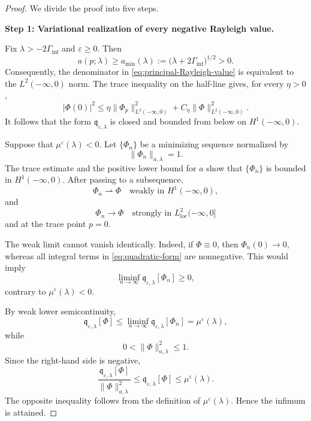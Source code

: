 \documentclass[11pt,reqno]{amsart}
\numberwithin{equation}{section}
\theoremstyle{definition}
\theoremstyle{remark}
\begin{document}
\begin{proof}
We divide the proof into five steps.

\medskip
\noindent
\textbf{Step 1: Variational realization of every negative Rayleigh value.}

Fix $\lambda>-2\Gamma_{\inf}$ and $\varepsilon\geq0$.  Then
\[
a(p;\lambda)\geq
a_{\min}(\lambda)
:=
\bigl(\lambda+2\Gamma_{\inf}\bigr)^{1/2}>0.
\]
Consequently, the denominator in
\eqref{eq:principal-Rayleigh-value} is equivalent to the
$L^2(-\infty,0)$ norm.  The trace inequality on the half-line gives,
for every $\eta>0$,
\[
|\Phi(0)|^2
\leq
\eta\|\Phi_p\|_{L^2(-\infty,0)}^2
+
C_\eta\|\Phi\|_{L^2(-\infty,0)}^2.
\]
It follows that the form
$\mathfrak q_{\varepsilon,\lambda}$ is closed and bounded from below on
$H^1(-\infty,0)$.

Suppose that $\mu^\varepsilon(\lambda)<0$.  Let $\{\Phi_n\}$ be a minimizing
sequence normalized by
\[
\|\Phi_n\|_{a,\lambda}=1.
\]
The trace estimate and the positive lower bound for $a$ show that
$\{\Phi_n\}$ is bounded in $H^1(-\infty,0)$.  After passing to a
subsequence,
\[
\Phi_n\rightharpoonup\Phi
\quad\text{weakly in }H^1(-\infty,0),
\]
and
\[
\Phi_n\longrightarrow\Phi
\quad\text{strongly in }L^2_{\mathrm{loc}}(-\infty,0]
\]
and at the trace point $p=0$.

The weak limit cannot vanish identically.  Indeed, if $\Phi\equiv0$,
then $\Phi_n(0)\to0$, whereas all integral terms in
\eqref{eq:quadratic-form} are nonnegative.  This would imply
\[
\liminf_{n\to\infty}
\mathfrak q_{\varepsilon,\lambda}[\Phi_n]\geq0,
\]
contrary to $\mu^\varepsilon(\lambda)<0$.

By weak lower semicontinuity,
\[
\mathfrak q_{\varepsilon,\lambda}[\Phi]
\leq
\liminf_{n\to\infty}
\mathfrak q_{\varepsilon,\lambda}[\Phi_n]
=
\mu^\varepsilon(\lambda),
\]
while
\[
0<\|\Phi\|_{a,\lambda}^2\leq1.
\]
Since the right-hand side is negative,
\[
\frac{\mathfrak q_{\varepsilon,\lambda}[\Phi]}
{\|\Phi\|_{a,\lambda}^2}
\leq
\mathfrak q_{\varepsilon,\lambda}[\Phi]
\leq
\mu^\varepsilon(\lambda).
\]
The opposite inequality follows from the definition of
$\mu^\varepsilon(\lambda)$.  Hence the infimum is attained.


\end{proof}
\end{document}
